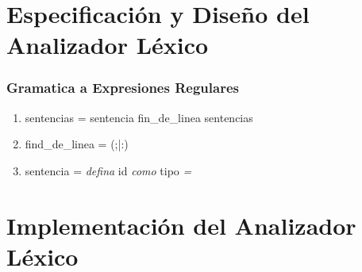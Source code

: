 \section{Especificación y Diseño del Analizador Léxico}

\subsubsection{Gramatica a Expresiones Regulares}

\begin{enumerate}
    \item sentencias = sentencia fin\_de\_linea sentencias
    \item find\_de\_linea = (;|:)
    \item sentencia = \textit{defina} id \textit{como} tipo \textit{=}
\end{enumerate}

\section{Implementación del Analizador Léxico}